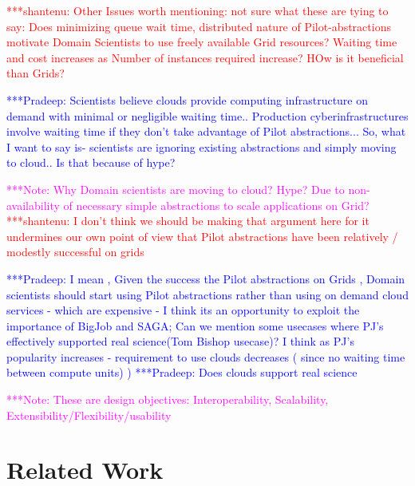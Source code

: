 \documentclass[times]{cpeauth}
\newcommand{\jhanote}[1]{ {\textcolor{red} { ***shantenu: #1 }}}
\newcommand{\pmnote}[1]{ {\textcolor{blue} { ***Pradeep: #1 }}}
\newcommand{\note}[1]{ {\textcolor{magenta} { ***Note: #1 }}}
\newcommand{\pmnote}[1]{}
\newcommand{\jhanote}[1]{}
\newcommand{\note}[1]{}
\begin{document}
\jhanote{Other Issues worth mentioning: not sure what these are tying
 to say: Does minimizing queue wait time, distributed nature of
 Pilot-abstractions motivate Domain Scientists to use freely available
 Grid resources?  Waiting time and cost increases as Number of
 instances required increase?  HOw is it beneficial than Grids?}


\pmnote{ Scientists believe clouds provide computing infrastructure on demand with minimal or negligible waiting time..  Production cyberinfrastructures involve waiting time if they don't take advantage of Pilot abstractions...  So, what I want to say is- scientists are ignoring existing abstractions and simply moving to cloud.. Is that because of hype? }

\note{Why Domain scientists are moving to cloud? Hype? Due to
  non-availability of necessary simple abstractions to scale
  applications on Grid?} \jhanote{I don't think we should be making
    that argument here for it undermines our own point of view that
    Pilot abstractions have been relatively / modestly successful on
    grids}

\pmnote{ I mean , Given the success the Pilot abstractions on Grids , Domain scientists should start using Pilot abstractions rather than using on demand cloud services - which are expensive - I think its an opportunity to exploit the importance of BigJob and SAGA;  Can we mention some usecases where PJ's effectively supported real science(Tom Bishop usecase)? 
I think as PJ's popularity increases - requirement to use clouds decreases ( since no waiting time between compute units) )}
\pmnote{Does clouds support real science}

\note{These are design objectives: Interoperability, Scalability,
  Extensibility/Flexibility/usability}





\section{Related Work}
\end{document}
